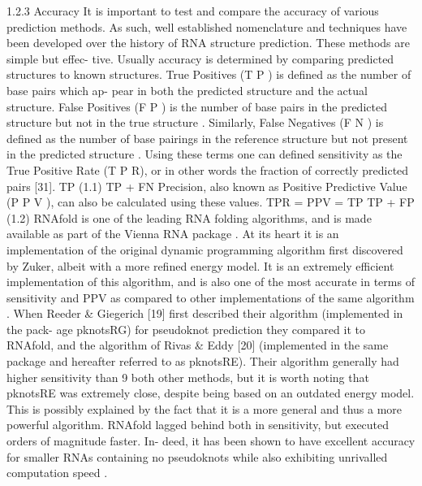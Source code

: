 \documentclass{cshonours}
\begin{document}
1.2.3 Accuracy
It is important to test and compare the accuracy of various prediction methods.
As such, well established nomenclature and techniques have been developed over
the history of RNA structure prediction. These methods are simple but effec-
tive. Usually accuracy is determined by comparing predicted structures to known
structures. True Positives (T P ) is defined as the number of base pairs which ap-
pear in both the predicted structure and the actual structure. False Positives
(F P ) is the number of base pairs in the predicted structure but not in the true
structure \cite{lorenz2011viennarna}. Similarly, False Negatives (F N ) is defined as the number of base
pairings in the reference structure but not present in the predicted structure \cite{lorenz2011viennarna}.
Using these terms one can defined sensitivity as the True Positive Rate (T P R),
or in other words the fraction of correctly predicted pairs [31].
TP
(1.1)
TP + FN
Precision, also known as Positive Predictive Value (P P V ), can also be calculated
using these values.
TPR =
PPV =
TP
TP + FP
(1.2)
RNAfold is one of the leading RNA folding algorithms, and is made available
as part of the Vienna RNA package \cite{lorenz2011viennarna}. At its heart it is an implementation
of the original dynamic programming algorithm first discovered by Zuker, albeit
with a more refined energy model. It is an extremely efficient implementation of
this algorithm, and is also one of the most accurate in terms of sensitivity and
PPV as compared to other implementations of the same algorithm \cite{lorenz2011viennarna}. When
Reeder \& Giegerich [19] first described their algorithm (implemented in the pack-
age pknotsRG) for pseudoknot prediction they compared it to RNAfold, and the
algorithm of Rivas \& Eddy [20] (implemented in the same package and hereafter
referred to as pknotsRE). Their algorithm generally had higher sensitivity than
9
both other methods, but it is worth noting that pknotsRE was extremely close,
despite being based on an outdated energy model. This is possibly explained by
the fact that it is a more general and thus a more powerful algorithm. RNAfold
lagged behind both in sensitivity, but executed orders of magnitude faster. In-
deed, it has been shown to have excellent accuracy for smaller RNAs containing
no pseudoknots while also exhibiting unrivalled computation speed \cite{lorenz2011viennarna}.
\end{document}
